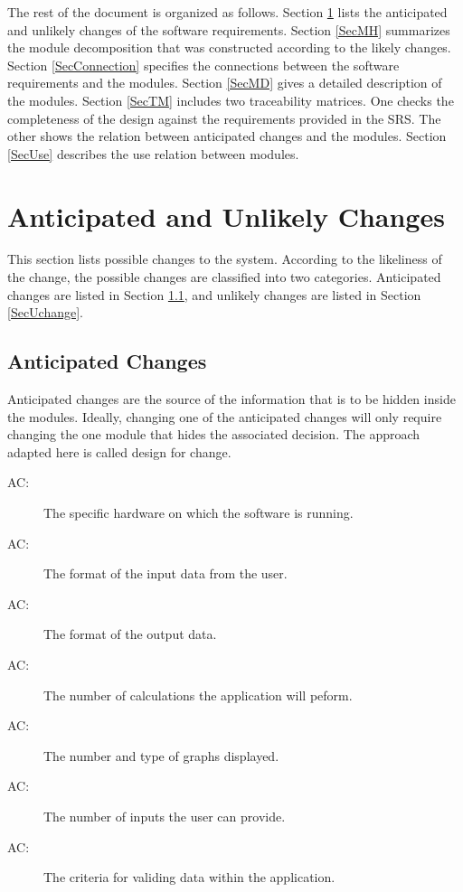 \documentclass[12pt, titlepage]{article}
\newcounter{acnum}
\newcommand{\actheacnum}{AC\theacnum}
\begin{document}
The rest of the document is organized as follows. Section
\ref{SecChange} lists the anticipated and unlikely changes of the software
requirements. Section \ref{SecMH} summarizes the module decomposition that
was constructed according to the likely changes. Section \ref{SecConnection}
specifies the connections between the software requirements and the
modules. Section \ref{SecMD} gives a detailed description of the
modules. Section \ref{SecTM} includes two traceability matrices. One checks
the completeness of the design against the requirements provided in the SRS. The
other shows the relation between anticipated changes and the modules. Section
\ref{SecUse} describes the use relation between modules.

\section{Anticipated and Unlikely Changes} \label{SecChange}

This section lists possible changes to the system. According to the likeliness
of the change, the possible changes are classified into two
categories. Anticipated changes are listed in Section \ref{SecAchange}, and
unlikely changes are listed in Section \ref{SecUchange}.

\subsection{Anticipated Changes} \label{SecAchange}

Anticipated changes are the source of the information that is to be hidden
inside the modules. Ideally, changing one of the anticipated changes will only
require changing the one module that hides the associated decision. The approach
adapted here is called design for
change.

\begin{description}
\item[ \actheacnum \label{acHardware}:] The specific
  hardware on which the software is running.
\item[ \actheacnum \label{acInput}:] The format of the
  input data from the user.
\item[ \actheacnum \label{acOutput}:] The format of the output data.
\item[ \actheacnum \label{acCalculation}:] The number of calculations the application will peform.
\item[ \actheacnum \label{acGraph}:] The number and type of graphs displayed.
\item[ \actheacnum \label{acNumInput}:] The number of inputs the user can provide.
\item[ \actheacnum \label{acValidation}:] The criteria for validing data within the application.
\end{description}
\end{document}
